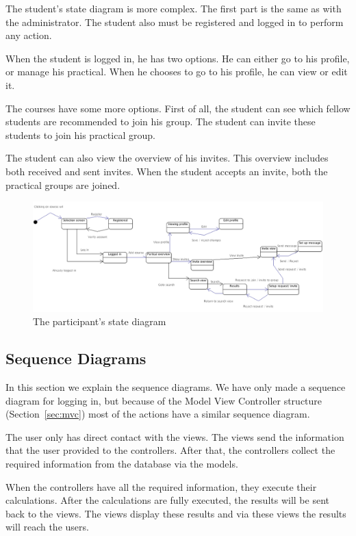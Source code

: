 The student's state diagram is more complex.
The first part is the same as with the administrator.
The student also must be registered and logged in to perform any action.

When the student is logged in, he has two options.
He can either go to his profile, or manage his practical.
When he chooses to go to his profile, he can view or edit it.

The courses have some more options.
First of all, the student can see which fellow students are recommended to join his group.
The student can invite these students to join his practical group.

The student can also view the overview of his invites.
This overview includes both received and sent invites.
When the student accepts an invite, both the practical groups are joined.

\begin{figure}[H]
    \centering
    \captionsetup{justification=centering}
    \includegraphics[width=\textwidth, frame]{images/state_diagram_participant}
    \caption{The participant's state diagram}
    \label{state_diagram_participant}
\end{figure}

\subsection{Sequence Diagrams}
In this section we explain the sequence diagrams.
We have only made a sequence diagram for logging in, but because of the Model View Controller structure (Section~\ref{sec:mvc}) most of the actions have a similar sequence diagram.

The user only has direct contact with the views.
The views send the information that the user provided to the controllers.
After that, the controllers collect the required information from the database via the models.

When the controllers have all the required information, they execute their calculations.
After the calculations are fully executed, the results will be sent back to the views.
The views display these results and via these views the results will reach the users.

